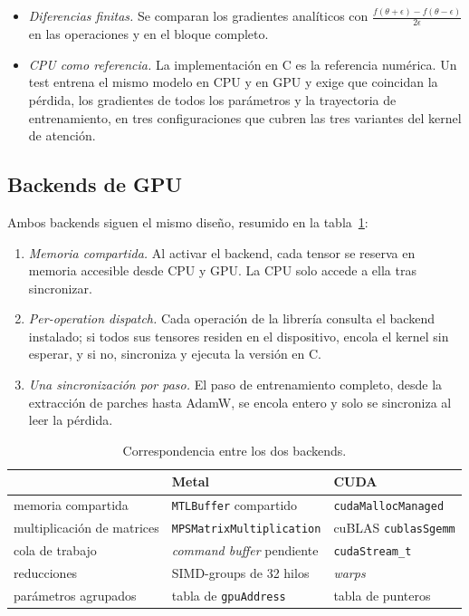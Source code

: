 \documentclass[11pt,a4paper]{article}
\begin{document}
\begin{itemize}
  \item \emph{Diferencias finitas.} Se comparan los gradientes analíticos con
        $\frac{f(\theta+\epsilon)-f(\theta-\epsilon)}{2\epsilon}$ en las
        operaciones y en el bloque completo.
  \item \emph{CPU como referencia.} La implementación en C es la referencia
        numérica. Un test entrena el mismo modelo en CPU y en GPU y exige que
        coincidan la pérdida, los gradientes de todos los parámetros y la
        trayectoria de entrenamiento, en tres configuraciones que cubren las
        tres variantes del kernel de atención.
\end{itemize}

\subsection{Backends de GPU}

Ambos backends siguen el mismo diseño, resumido en la
tabla~\ref{tab:backends}:

\begin{enumerate}
  \item \emph{Memoria compartida.} Al activar el backend, cada tensor se reserva
        en memoria accesible desde CPU y GPU. La CPU solo accede a ella tras
        sincronizar.
  \item \emph{Per-operation dispatch.} Cada operación de la librería consulta
        el backend instalado; si todos sus tensores residen en el dispositivo,
        encola el kernel sin esperar, y si no, sincroniza y ejecuta la versión
        en C.
  \item \emph{Una sincronización por paso.} El paso de entrenamiento completo,
        desde la extracción de parches hasta AdamW, se encola entero y solo se
        sincroniza al leer la pérdida.
\end{enumerate}

\begin{table}[H]
  \centering\small
  \begin{tabular}{lll}
    \toprule
    & Metal & CUDA \\
    \midrule
    memoria compartida    & \texttt{MTLBuffer} compartido & \texttt{cudaMallocManaged} \\
    multiplicación de matrices & \texttt{MPSMatrixMultiplication} & cuBLAS \texttt{cublasSgemm} \\
    cola de trabajo       & \emph{command buffer} pendiente & \texttt{cudaStream\_t} \\
    reducciones           & SIMD-groups de 32 hilos & \emph{warps} \\
    parámetros agrupados  & tabla de \texttt{gpuAddress} & tabla de punteros \\
    \bottomrule
  \end{tabular}
  \caption{Correspondencia entre los dos backends.}
  \label{tab:backends}
\end{table}
\end{document}
